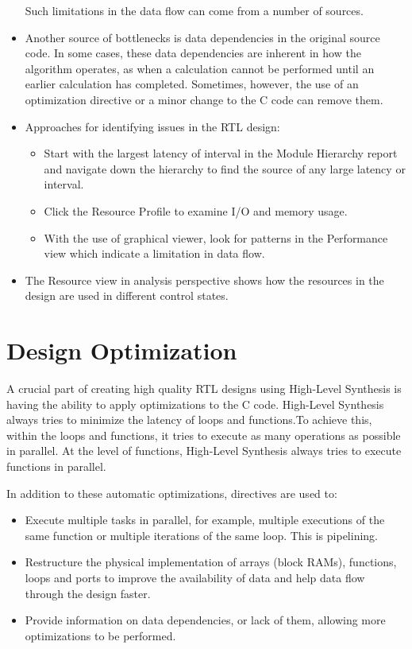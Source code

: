 \begin{itemize}
    Such limitations in the data flow can come from a number of sources.
    \item Another source of bottlenecks is data dependencies in the original source code. In some cases, these data dependencies are inherent in how the algorithm operates, as when a calculation cannot be performed until an earlier calculation has completed. Sometimes, however, the use of an optimization directive or a minor change to the C code can remove them.
    \item Approaches for identifying issues in the RTL design: 
    \begin{itemize}
        \item Start with the largest latency of interval in the Module Hierarchy report and navigate down the hierarchy to find the source of any large latency or interval.
        \item Click the Resource Profile to examine I/O and memory usage.
        \item With the use of graphical viewer, look for patterns in the Performance view which indicate a limitation in data flow.
    \end{itemize}
    \item The Resource view in analysis perspective shows how the resources in the design are used in different control states.
\end{itemize}



\section{Design Optimization}
A crucial part of creating high quality RTL designs using High-Level Synthesis is having the
ability to apply optimizations to the C code. High-Level Synthesis always tries to minimize
the latency of loops and functions.To achieve this, within the loops and functions, it tries to
execute as many operations as possible in parallel. At the level of functions, High-Level
Synthesis always tries to execute functions in parallel.

In addition to these automatic optimizations, directives are used to:
\begin{itemize}
    \item Execute multiple tasks in parallel, for example, multiple executions of the same function
    or multiple iterations of the same loop. This is pipelining.
    \item Restructure the physical implementation of arrays (block RAMs), functions, loops and
    ports to improve the availability of data and help data flow through the design faster.
    \item Provide information on data dependencies, or lack of them, allowing more
    optimizations to be performed.
\end{itemize}

